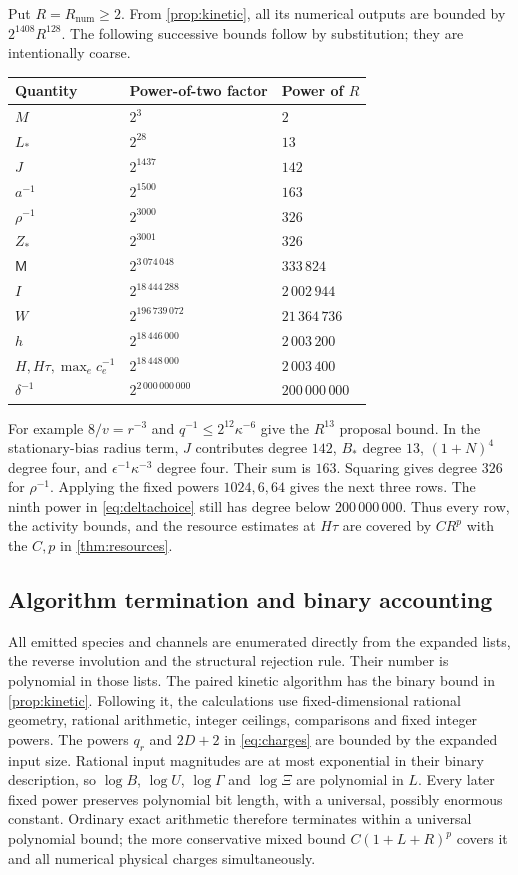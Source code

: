 \documentclass[11pt]{article}
\numberwithin{equation}{section}
\theoremstyle{definition}
\theoremstyle{remark}\newtheorem{remark}[theorem]{Remark}
\newcommand{\Rnum}{R_{\mathrm{num}}}
\begin{document}
Put $R=\Rnum\ge2$. From \cref{prop:kinetic}, all its numerical outputs
are bounded by $2^{1408}R^{128}$. The following successive bounds follow
by substitution; they are intentionally coarse.
\begin{center}\small
\begin{tabular}{@{}lll@{}}\toprule
Quantity & Power-of-two factor & Power of $R$\\\midrule
$M$ & $2^3$ & $2$\\
$L_*$ & $2^{28}$ & $13$\\
$J$ & $2^{1437}$ & $142$\\
$a^{-1}$ & $2^{1500}$ & $163$\\
$\rho^{-1}$ & $2^{3000}$ & $326$\\
$Z_*$ & $2^{3001}$ & $326$\\
$\mathsf M$ & $2^{3\,074\,048}$ & $333\,824$\\
$I$ & $2^{18\,444\,288}$ & $2\,002\,944$\\
$W$ & $2^{196\,739\,072}$ & $21\,364\,736$\\
$h$ & $2^{18\,446\,000}$ & $2\,003\,200$\\
$H,H\tau,\max_e c_e^{-1}$ & $2^{18\,448\,000}$ & $2\,003\,400$\\
$\delta^{-1}$ & $2^{2\,000\,000\,000}$ & $200\,000\,000$\\
\bottomrule\end{tabular}
\end{center}
For example $8/v=r^{-3}$ and $q^{-1}\le2^{12}\kappa^{-6}$ give
the $R^{13}$ proposal bound. In the stationary-bias radius term,
$J$ contributes degree $142$, $B_*$ degree $13$, $(1+N)^4$ degree four,
and $\epsilon^{-1}\kappa^{-3}$ degree four. Their sum is $163$.
Squaring gives degree $326$ for $\rho^{-1}$. Applying the fixed powers
$1024,6,64$ gives the next three rows. The ninth power in
\eqref{eq:deltachoice} still has degree below $200\,000\,000$.
Thus every row, the activity bounds, and the resource estimates at $H\tau$
are covered by $C R^p$ with the $C,p$ in \cref{thm:resources}.

\subsection{Algorithm termination and binary accounting}

All emitted species and channels are enumerated directly from the expanded
lists, the reverse involution and the structural rejection rule. Their
number is polynomial in those lists. The paired kinetic algorithm has the
binary bound in \cref{prop:kinetic}. Following it, the calculations use
fixed-dimensional rational geometry, rational arithmetic, integer ceilings,
comparisons and fixed integer powers. The powers $q_r$ and $2D+2$ in
\eqref{eq:charges} are bounded by the expanded input size. Rational input
magnitudes are at most exponential in their binary description, so
$\log B$, $\log U$, $\log\Gamma$ and $\log\Xi$ are polynomial in $L$.
Every later fixed power preserves polynomial bit length, with a universal,
possibly enormous constant. Ordinary exact arithmetic therefore terminates
within a universal polynomial bound; the more conservative mixed bound
$C(1+L+R)^p$ covers it and all numerical physical charges simultaneously.
\end{document}
